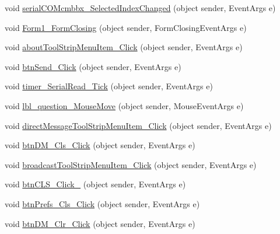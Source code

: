\begin{DoxyCompactItemize}
\item 
void \hyperlink{class_sr_p___classroom_inq_1_1frm_classrrom_inq_aadea414ad99ecd09aa912edabf105448}{serial\-C\-O\-Mcmbbx\-\_\-\-Selected\-Index\-Changed} (object sender, \-Event\-Args e)
\item 
void \hyperlink{class_sr_p___classroom_inq_1_1frm_classrrom_inq_a6a257d6e30f5e9370c72b475aff7aafa}{\-Form1\-\_\-\-Form\-Closing} (object sender, \-Form\-Closing\-Event\-Args e)
\item 
void \hyperlink{class_sr_p___classroom_inq_1_1frm_classrrom_inq_aa814f588d2d4abeed64487cdb14fab7b}{about\-Tool\-Strip\-Menu\-Item\-\_\-\-Click} (object sender, \-Event\-Args e)
\item 
void \hyperlink{class_sr_p___classroom_inq_1_1frm_classrrom_inq_a42ab065ed95503b1313dbed6395cde09}{btn\-Send\-\_\-\-Click} (object sender, \-Event\-Args e)
\item 
void \hyperlink{class_sr_p___classroom_inq_1_1frm_classrrom_inq_a998211ade205915b4c2e1ccfff8f0243}{timer\-\_\-\-Serial\-Read\-\_\-\-Tick} (object sender, \-Event\-Args e)
\item 
void \hyperlink{class_sr_p___classroom_inq_1_1frm_classrrom_inq_a54d8d58aacb4265d0e3083f8153b0595}{lbl\-\_\-question\-\_\-\-Mouse\-Move} (object sender, \-Mouse\-Event\-Args e)
\item 
void \hyperlink{class_sr_p___classroom_inq_1_1frm_classrrom_inq_a9c1ad2d103578bed5a65f1c744124f03}{direct\-Message\-Tool\-Strip\-Menu\-Item\-\_\-\-Click} (object sender, \-Event\-Args e)
\item 
void \hyperlink{class_sr_p___classroom_inq_1_1frm_classrrom_inq_a1c2055b50c4476070c6272f0462ee640}{btn\-D\-M\-\_\-\-Cls\-\_\-\-Click} (object sender, \-Event\-Args e)
\item 
void \hyperlink{class_sr_p___classroom_inq_1_1frm_classrrom_inq_a5a5c0fb174e0ecda3389793bcb45d6e7}{broadcast\-Tool\-Strip\-Menu\-Item\-\_\-\-Click} (object sender, \-Event\-Args e)
\item 
void \hyperlink{class_sr_p___classroom_inq_1_1frm_classrrom_inq_ad58148cfab611b8ad1b98f0325a12d20}{btn\-C\-L\-S\-\_\-\-Click\-\_} (object sender, \-Event\-Args e)
\item 
void \hyperlink{class_sr_p___classroom_inq_1_1frm_classrrom_inq_a382353840dd2e621af4b5a63ddb909fa}{btn\-Prefs\-\_\-\-Cls\-\_\-\-Click} (object sender, \-Event\-Args e)
\item 
void \hyperlink{class_sr_p___classroom_inq_1_1frm_classrrom_inq_af62b391dc8305d62127bed60356d1a77}{btn\-D\-M\-\_\-\-Clr\-\_\-\-Click} (object sender, \-Event\-Args e)

\end{DoxyCompactItemize}
